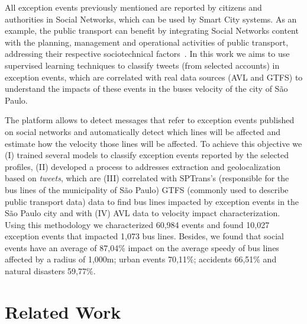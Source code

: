 \documentclass[runningheads]{llncs}
\begin{document}
All exception events previously mentioned are reported by citizens and authorities in Social Networks, which can be used by Smart City systems. As an example, the public transport can benefit by integrating Social Networks content with the planning, management and operational activities of public transport, addressing their respective sociotechnical factors~\cite{kuflik2017automating}. In this work we aims to use supervised learning techniques to classify tweets (from selected accounts) in exception events, which are correlated with real data sources (AVL and GTFS) to understand the impacts of these events in the buses velocity of the city of São Paulo.

The platform allows to detect messages that refer to exception events published on social networks and automatically detect which lines will be affected and estimate how the velocity those lines will be affected. To achieve this objective we (I) trained several models to classify exception events reported by the selected profiles, (II) developed a process to addresses extraction and geolocalization based on \textit{tweets}, which are (III) correlated with SPTrans's (responsible for the bus lines of the municipality of São Paulo) GTFS (commonly used to describe public transport data) data to find bus lines impacted by exception events in the São Paulo city and with (IV) AVL data to velocity impact characterization. Using this methodology we characterized 60,984 events and found 10,027 exception events that impacted 1,073 bus lines. Besides, we found that social events have an average of 87,04\% impact on the average speedy of bus lines affected by a radius of 1,000m; urban events 70,11\%; accidents 66,51\% and natural disasters 59,77\%.

\section{Related Work}
\end{document}
